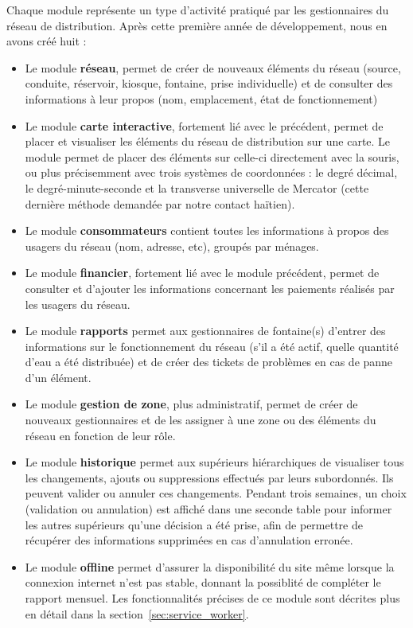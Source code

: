 \documentclass{EPL-master-thesis-covers-FR}
\begin{document}
			Chaque module représente un type d'activité pratiqué par les gestionnaires du réseau de distribution. Après cette première année de développement, nous en avons créé huit :
			\begin{itemize}
				\item Le module \textbf{réseau}, permet de créer de nouveaux éléments du réseau (source, conduite, réservoir, kiosque, fontaine, prise individuelle) et de consulter des informations à leur propos (nom, emplacement, état de fonctionnement)
				\item Le module \textbf{carte interactive}, fortement lié avec le précédent, permet de placer et visualiser les éléments du réseau de distribution sur une carte. Le module permet de placer des éléments sur celle-ci directement avec la souris, ou plus précisemment avec trois systèmes de coordonnées : le degré décimal, le degré-minute-seconde et la transverse universelle de Mercator (cette dernière méthode demandée par notre contact haïtien).
				\item Le module \textbf{consommateurs} contient toutes les informations à propos des usagers du réseau (nom, adresse, etc), groupés par ménages.
				\item Le module \textbf{financier}, fortement lié avec le module précédent, permet de consulter et d'ajouter les informations concernant les paiements réalisés par les usagers du réseau.
				\item Le module \textbf{rapports} permet aux gestionnaires de fontaine(s) d'entrer des informations sur le fonctionnement du réseau (s'il a été actif, quelle quantité d'eau a été distribuée) et de créer des tickets de problèmes en cas de panne d'un élément.
				\item Le module \textbf{gestion de zone}, plus administratif, permet de créer de nouveaux gestionnaires et de les assigner à une zone ou des éléments du réseau en fonction de leur rôle.
				\item Le module \textbf{historique} permet aux supérieurs hiérarchiques de visualiser tous les changements, ajouts ou suppressions effectués par leurs subordonnés. Ils peuvent valider ou annuler ces changements. Pendant trois semaines, un choix (validation ou annulation) est affiché dans une seconde table pour informer les autres supérieurs qu'une décision a été prise, afin de permettre de récupérer des informations supprimées en cas d'annulation erronée.
				\item Le module \textbf{offline} permet d'assurer la disponibilité du site même lorsque la connexion internet n'est pas stable, donnant la possiblité de compléter le rapport mensuel. Les fonctionnalités précises de ce module sont décrites plus en détail dans la section~\ref{sec:service_worker}.
			\end{itemize}
\end{document}
